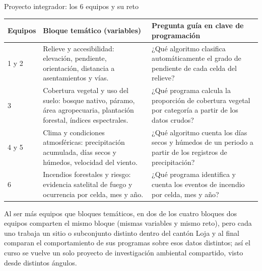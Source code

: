 \documentclass[aspectratio=169,11pt]{beamer}
\begin{document}
\begin{frame}{Proyecto integrador: los 6 equipos y su reto}
\tiny
\renewcommand{\arraystretch}{1.0}
\begin{tabularx}{\textwidth}{C{1.6cm}L{2.9cm}Y}
\toprule
\textbf{Equipos} & \textbf{Bloque temático (variables)} & \textbf{Pregunta guía en clave de programación} \\
 y 2 & Relieve y accesibilidad: elevación, pendiente, orientación, distancia a asentamientos y vías. & ¿Qué algoritmo clasifica automáticamente el grado de pendiente de cada celda del relieve? \\
3 & Cobertura vegetal y uso del suelo: bosque nativo, páramo, área agropecuaria, plantación forestal, índices espectrales. & ¿Qué programa calcula la proporción de cobertura vegetal por categoría a partir de los datos crudos? \\
4 y 5 & Clima y condiciones atmosféricas: precipitación acumulada, días secos y húmedos, velocidad del viento. & ¿Qué algoritmo cuenta los días secos y húmedos de un periodo a partir de los registros de precipitación? \\
6 & Incendios forestales y riesgo: evidencia satelital de fuego y ocurrencia por celda, mes y año. & ¿Qué programa identifica y cuenta los eventos de incendio por celda, mes y año? \\
\bottomrule
\end{tabularx}
\vspace{0.1cm}
\begin{keybox}[top=2pt,bottom=2pt]
Al ser más equipos que bloques temáticos, en dos de los cuatro bloques dos equipos comparten el mismo bloque (mismas variables y mismo reto), pero cada uno trabaja un sitio o subconjunto distinto dentro del cantón Loja y al final comparan el comportamiento de sus programas sobre esos datos distintos; así el curso se vuelve un solo proyecto de investigación ambiental compartido, visto desde distintos ángulos.
\end{keybox}
\end{frame}
\end{document}
